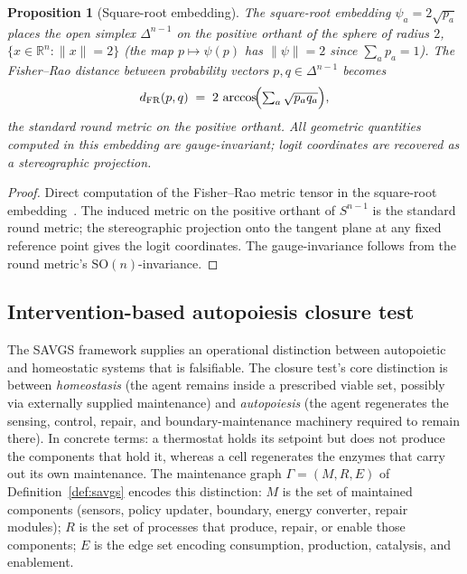 \documentclass[11pt,a4paper]{article}
\theoremstyle{plain}
\newtheorem{proposition}[theorem]{Proposition}
\theoremstyle{definition}
\theoremstyle{remark}
\newcommand{\RR}{\mathbb{R}}
\newcommand{\SO}{\mathrm{SO}}
\begin{document}
\begin{proposition}[Square-root embedding]\label{prop:sqrt}
The square-root embedding $\psi_a = 2\sqrt{p_a}$ places the open simplex
$\Delta^{n-1}$ on the positive orthant of the sphere of radius
$2$, $\{x\in\RR^n : \|x\| = 2\}$ (the map $p \mapsto \psi(p)$ has
$\|\psi\| = 2$ since $\sum_a p_a = 1$). The Fisher--Rao distance between probability
vectors $p,q\in\Delta^{n-1}$ becomes
\begin{equation}\label{eq:fr}
  d_{\mathrm{FR}}(p,q) \;=\; 2\,\arccos\!\Bigl(\textstyle\sum_a\sqrt{p_a q_a}\Bigr),
\end{equation}
the standard round metric on the positive orthant. All geometric
quantities computed in this embedding are gauge-invariant; logit
coordinates are recovered as a stereographic projection.
\end{proposition}

\begin{proof}
Direct computation of the Fisher--Rao metric tensor in the square-root
embedding~\cite{bhattacharyya1943,amari2000}. The induced metric on the
positive orthant of $S^{n-1}$ is the standard round metric; the
stereographic projection onto the tangent plane at any fixed reference
point gives the logit coordinates. The gauge-invariance follows from
the round metric's $\SO(n)$-invariance.
\end{proof}

\subsection{Intervention-based autopoiesis closure test}

\label{sec:kappa-closure}
The SAVGS framework supplies an operational distinction between
autopoietic and homeostatic systems that is falsifiable. The closure test's core distinction is between \emph{homeostasis} (the agent remains
inside a prescribed viable set, possibly via externally supplied
maintenance) and \emph{autopoiesis} (the agent regenerates the sensing,
control, repair, and boundary-maintenance machinery required to remain
there). In concrete terms: a thermostat holds its setpoint but does
not produce the components that hold it, whereas a cell regenerates
the enzymes that carry out its own maintenance. The maintenance graph $\Gamma = (M, R, E)$ of
Definition~\ref{def:savgs} encodes this distinction: $M$ is the set of
maintained components (sensors, policy updater, boundary, energy
converter, repair modules); $R$ is the set of processes that produce,
repair, or enable those components; $E$ is the edge set encoding
consumption, production, catalysis, and enablement.
\end{document}
